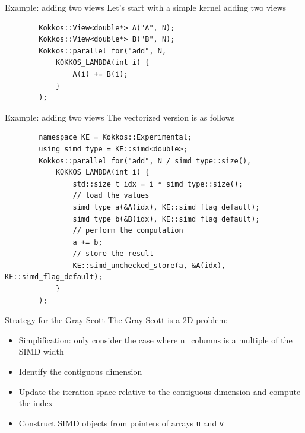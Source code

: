 \documentclass[
    aspectratio=169,
]{beamer}
\begin{document}
\begin{frame}[fragile]{Example: adding two views}
    Let's start with a simple kernel adding two views
    \begin{verbatim}
        Kokkos::View<double*> A("A", N);
        Kokkos::View<double*> B("B", N);
        Kokkos::parallel_for("add", N,
            KOKKOS_LAMBDA(int i) {
                A(i) += B(i);
            }
        );
    \end{verbatim}
\end{frame}

\begin{frame}[fragile]{Example: adding two views}
    The vectorized version is as follows
    \begin{verbatim}
        namespace KE = Kokkos::Experimental;
        using simd_type = KE::simd<double>;
        Kokkos::parallel_for("add", N / simd_type::size(),
            KOKKOS_LAMBDA(int i) {
                std::size_t idx = i * simd_type::size();
                // load the values
                simd_type a(&A(idx), KE::simd_flag_default);
                simd_type b(&B(idx), KE::simd_flag_default);
                // perform the computation
                a += b;
                // store the result
                KE::simd_unchecked_store(a, &A(idx), KE::simd_flag_default);
            }
        );
    \end{verbatim}
\end{frame}

\begin{frame}{Strategy for the Gray Scott}
    The Gray Scott is a 2D problem:
    \begin{itemize}
        \item Simplification: only consider the case where n\_columns is a multiple of the SIMD width
        \item Identify the contiguous dimension
        \item Update the iteration space relative to the contiguous dimension and compute the index
        \item Construct SIMD objects from pointers of arrays \texttt{u} and \texttt{v}
    \end{itemize}
\end{frame}
\end{document}
